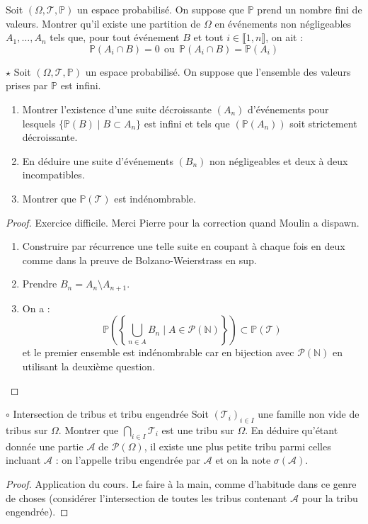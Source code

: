 \documentclass[french,a4paper]{article}
\renewcommand{\P}{\mathbb{P}}
\newcommand{\N}{\mathbb{N}}
\theoremstyle{plain}
\theoremstyle{definition}
\theoremstyle{remark}
\begin{document}
\begin{ex}[Moulin.33]{}
	Soit $(\Omega,\mathcal{T},\P)$ un espace probabilisé. On suppose que $\P$ prend un nombre fini de valeurs. Montrer qu'il existe une partition de $\Omega$ en événements non négligeables $A_1,\ldots,A_n$ tels que, pour tout événement $B$ et tout $i\in\llbracket1,n\rrbracket$, on ait : $$\P(A_i\cap B)=0\ \ \text{ou}\ \ \P(A_i\cap B)=\P(A_i)$$
\end{ex}

\begin{ex}[Moulin.34]{$\star$}
	Soit $(\Omega,\mathcal{T},\P)$ un espace probabilisé. On suppose que l'ensemble des valeurs prises par $\P$ est infini.
	\begin{enumerate}
		\item Montrer l'existence d'une suite décroissante $(A_n)$ d'événements pour lesquels $\{\P(B)\mid B\subset A_n\}$ est infini et tels que $(\P(A_n))$ soit strictement décroissante.
		\item En déduire une suite d'événements $(B_n)$ non négligeables et deux à deux incompatibles.
		\item Montrer que $\P(\mathcal{T})$ est indénombrable.
	\end{enumerate}
\end{ex}
\begin{proof}
	Exercice difficile. Merci Pierre pour la correction quand Moulin a dispawn.
	\begin{enumerate}
		\item Construire par récurrence une telle suite en coupant à chaque fois en deux comme dans la preuve de Bolzano-Weierstrass en sup.
		\item Prendre $B_n=A_{n}\setminus A_{n+1}$.
		\item On a : $$\P\left(\left\{\bigcup_{n\in A}B_n\mid A\in\mathcal{P}(\N)\right\}\right)\subset\P(\mathcal{T})$$ et le premier ensemble est indénombrable car en bijection avec $\mathcal{P}(\N)$ en utilisant la deuxième question.
	\end{enumerate}
\end{proof}

\begin{ex}[Moulin.35]{$\circ$ Intersection de tribus et tribu engendrée}
	Soit $\left(\mathcal{T}_i\right)_{i\in I}$ une famille non vide de tribus sur $\Omega$. Montrer que $\displaystyle\bigcap_{i\in I}\mathcal{T}_i$ est une tribu sur $\Omega$. En déduire qu'étant donnée une partie $\mathcal{A}$ de $\mathcal{P}(\Omega)$, il existe une plus petite tribu parmi celles incluant $\mathcal{A}$ : on l'appelle tribu engendrée par $\mathcal{A}$ et on la note $\sigma(\mathcal{A})$.
\end{ex}
\begin{proof}
	Application du cours. Le faire à la main, comme d'habitude dans ce genre de choses (considérer l'intersection de toutes les tribus contenant $\mathcal{A}$ pour la tribu engendrée).
\end{proof}
\end{document}
